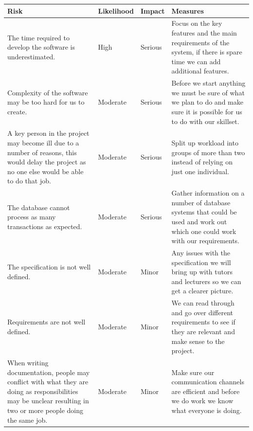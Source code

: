 \documentclass[11pt]{report}
\begin{document}
\begin{longtable}{| p{5.5cm} | p{2cm} | p{2cm} |  p{5.5cm} |}
\hline
\textbf{Risk} & \textbf{Likelihood} & \textbf{Impact} & \textbf{Measures} \\
\hline
\endfirsthead

\endlastfoot

\multicolumn{2}{c}{\textit{Continued from last page}}
\endhead

\multicolumn{2}{c}{\textit{Continued on next page}}
\endfoot

The time required to develop the software is underestimated. & 
High & 
Serious & 
Focus on the key features and the main requirements of the system, if there is spare time we can add additional features. \\ 
\hline
Complexity of the software may be too hard for us to create.&
Moderate&
Serious&
Before we start anything we must be sure of what we plan to do and make sure it is possible for us to do with our skillset.\\
\hline

A key person in the project may become ill due to a number of reasons, this would delay the project as no one else would be able to do that job.&
Moderate&
Serious&
Split up workload into groups of more than two instead of relying on just one individual.\\
\hline


The database cannot process as many transactions as expected.& 
Moderate&
Serious&
Gather information on a number of database systems that could be used and work out which one could work with our requirements.\\
\hline

The specification is not well defined.& 
Moderate&
Minor&
Any issues with the specification we will bring up with tutors and lecturers so we can get a clearer picture.\\
\hline


Requirements are not well defined.& 
Moderate&
Minor&
We can read through and go over different requirements to see  if they are relevant and make sense to the project.\\
\hline

When writing documentation, people may conflict with what they are doing as responsibilities may be unclear resulting in two or more people doing the same job.& 
Moderate&
Minor&
Make sure our communication channels are efficient and before we do work we know what everyone is doing.\\
\hline


\end{longtable}
\end{document}

